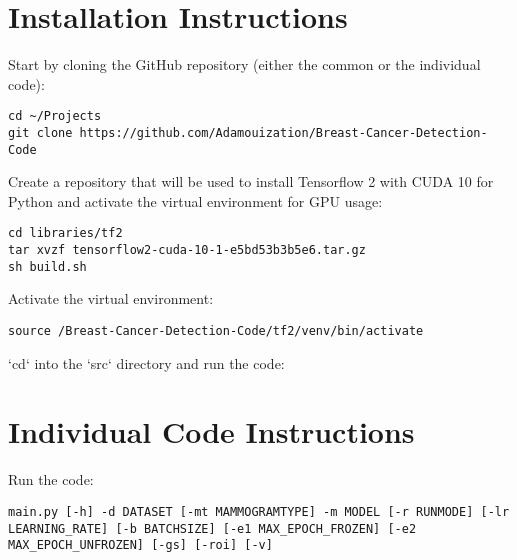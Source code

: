 \section{Installation Instructions}

Start by cloning the GitHub repository (either the common or the individual code):

\begin{lstlisting}
cd ~/Projects
git clone https://github.com/Adamouization/Breast-Cancer-Detection-Code
\end{lstlisting}

Create a repository that will be used to install Tensorflow 2 with CUDA 10 for Python and activate the virtual environment for GPU usage:

\begin{lstlisting}
cd libraries/tf2
tar xvzf tensorflow2-cuda-10-1-e5bd53b3b5e6.tar.gz
sh build.sh
\end{lstlisting}

Activate the virtual environment:

\begin{lstlisting}
source /Breast-Cancer-Detection-Code/tf2/venv/bin/activate
\end{lstlisting}

`cd` into the `src` directory and run the code:


\section{Individual Code Instructions}

Run the code:

\begin{lstlisting}
main.py [-h] -d DATASET [-mt MAMMOGRAMTYPE] -m MODEL [-r RUNMODE] [-lr LEARNING_RATE] [-b BATCHSIZE] [-e1 MAX_EPOCH_FROZEN] [-e2 MAX_EPOCH_UNFROZEN] [-gs] [-roi] [-v]
\end{lstlisting}

